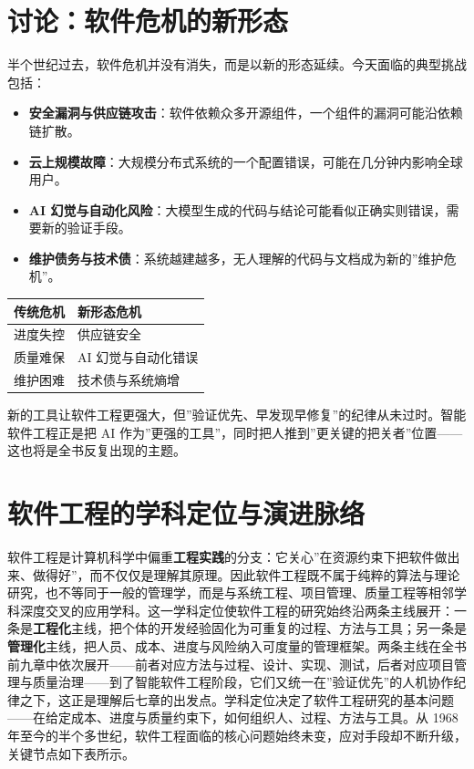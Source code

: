 \documentclass[12pt,a4paper,twoside,openany]{ctexbook}
\numberwithin{figure}{chapter}
\numberwithin{table}{chapter}
\providecommand{\tightlist}{\setlength{\itemsep}{0pt}\setlength{\parskip}{0pt}}
\newcounter{none}
\begin{document}
\section{讨论：软件危机的新形态}\label{ux8ba8ux8bbaux8f6fux4ef6ux5371ux673aux7684ux65b0ux5f62ux6001}

半个世纪过去，软件危机并没有消失，而是以新的形态延续。今天面临的典型挑战包括：

\begin{itemize}
\tightlist
\item
  \textbf{安全漏洞与供应链攻击}：软件依赖众多开源组件，一个组件的漏洞可能沿依赖链扩散。
\item
  \textbf{云上规模故障}：大规模分布式系统的一个配置错误，可能在几分钟内影响全球用户。
\item
  \textbf{AI
  幻觉与自动化风险}：大模型生成的代码与结论可能看似正确实则错误，需要新的验证手段。
\item
  \textbf{维护债务与技术债}：系统越建越多，无人理解的代码与文档成为新的''维护危机''。
\end{itemize}

{\def\LTcaptype{none} %
\begin{longtable}[]{@{}ll@{}}
\toprule\noalign{}
传统危机 & 新形态危机 \\
\midrule\noalign{}
\endhead
\bottomrule\noalign{}
\endlastfoot
进度失控 & 供应链安全 \\
质量难保 & AI 幻觉与自动化错误 \\
维护困难 & 技术债与系统熵增 \\
\end{longtable}
}

新的工具让软件工程更强大，但''验证优先、早发现早修复''的纪律从未过时。智能软件工程正是把
AI
作为''更强的工具''，同时把人推到''更关键的把关者''位置------这也将是全书反复出现的主题。

\section{软件工程的学科定位与演进脉络}\label{ux8f6fux4ef6ux5de5ux7a0bux7684ux5b66ux79d1ux5b9aux4f4dux4e0eux6f14ux8fdbux8109ux7edc}

软件工程是计算机科学中偏重\textbf{工程实践}的分支：它关心''在资源约束下把软件做出来、做得好''，而不仅仅是理解其原理。因此软件工程既不属于纯粹的算法与理论研究，也不等同于一般的管理学，而是与系统工程、项目管理、质量工程等相邻学科深度交叉的应用学科。这一学科定位使软件工程的研究始终沿两条主线展开：一条是\textbf{工程化}主线，把个体的开发经验固化为可重复的过程、方法与工具；另一条是\textbf{管理化}主线，把人员、成本、进度与风险纳入可度量的管理框架。两条主线在全书前九章中依次展开------前者对应方法与过程、设计、实现、测试，后者对应项目管理与质量治理------到了智能软件工程阶段，它们又统一在''验证优先''的人机协作纪律之下，这正是理解后七章的出发点。学科定位决定了软件工程研究的基本问题------在给定成本、进度与质量约束下，如何组织人、过程、方法与工具。从
1968
年至今的半个多世纪，软件工程面临的核心问题始终未变，应对手段却不断升级，关键节点如下表所示。
\end{document}
